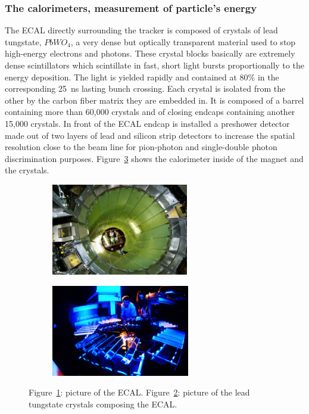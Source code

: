 		\subsubsection{The calorimeters, measurement of particle's energy}
		\label{chapt2:sssec:calo}
	
	The ECAL directly surrounding the tracker is composed of crystals of lead tungstate, $PbWO_4$, a very dense but optically transparent material used to stop high-energy electrons and photons. These crystal blocks basically are extremely dense scintillators which scintillate in fast, short light bursts proportionally to the energy deposition. The light is yielded rapidly and contained at 80\% in the corresponding \SI{25}{ns} lasting bunch crossing. Each crystal is isolated from the other by the carbon fiber matrix they are embedded in. It is composed of a barrel containing more than 60,000 crystals and of closing endcaps containing another 15,000 crystals. In front of the ECAL endcap is installed a preshower detector made out of two layers of lead and silicon strip detectors to increase the spatial resolution close to the beam line for pion-photon and single-double photon discrimination purposes. Figure~\ref{fig:ECAL} shows the calorimeter inside of the magnet and the crystals.
	
	\begin{figure}[H]
		\begin{subfigure}{0.5\linewidth}
			\centering
			\includegraphics[height = 4cm]{fig/chapt2/ECAL_barrel.jpg}
			\caption{\label{fig:ECAL:A}}
		\end{subfigure}
		\begin{subfigure}{0.5\linewidth}
			\centering
			\includegraphics[height = 4cm]{fig/chapt2/ECAL_crystals.jpg}
			\caption{\label{fig:ECAL:B}}
		\end{subfigure}
		\caption{\label{fig:ECAL} Figure~\ref{fig:ECAL:A}: picture of the ECAL. Figure~\ref{fig:ECAL:B}: picture of the lead tungstate crystals composing the ECAL.}
	\end{figure}
	
